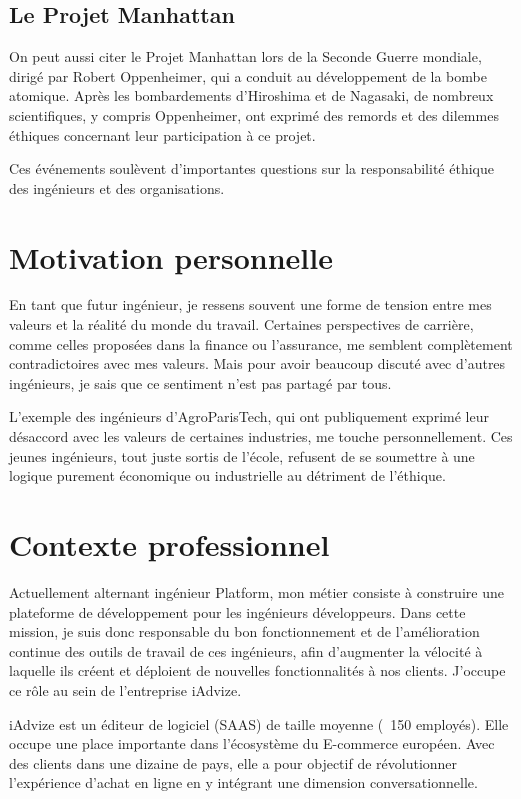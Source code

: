 \documentclass[12pt,a4paper]{report}
\begin{document}
\subsection*{Le Projet Manhattan}

On peut aussi citer le Projet Manhattan lors de la Seconde Guerre mondiale, dirigé par Robert Oppenheimer, qui a conduit au développement de la bombe atomique. Après les bombardements d'Hiroshima et de Nagasaki, de nombreux scientifiques, y compris Oppenheimer, ont exprimé des remords et des dilemmes éthiques concernant leur participation à ce projet.

Ces événements soulèvent d'importantes questions sur la responsabilité éthique des ingénieurs et des organisations.

\section*{Motivation personnelle}

En tant que futur ingénieur, je ressens souvent une forme de tension entre mes valeurs et la réalité du monde du travail.
Certaines perspectives de carrière, comme celles proposées dans la finance ou l’assurance, me semblent complètement contradictoires avec mes valeurs.
Mais pour avoir beaucoup discuté avec d'autres ingénieurs, je sais que ce sentiment n'est pas partagé par tous.

L’exemple des ingénieurs d’AgroParisTech, qui ont publiquement exprimé leur désaccord avec les valeurs de certaines industries, me touche personnellement.
Ces jeunes ingénieurs, tout juste sortis de l'école, refusent de se soumettre à une logique purement économique ou industrielle au détriment de l’éthique.

\section*{Contexte professionnel}

Actuellement alternant ingénieur Platform, mon métier consiste à construire une plateforme de développement pour les ingénieurs développeurs.
Dans cette mission, je suis donc responsable du bon fonctionnement et de l'amélioration continue des outils de travail de ces ingénieurs, afin d'augmenter la vélocité à laquelle ils créent et déploient de nouvelles fonctionnalités à nos clients.
J'occupe ce rôle au sein de l'entreprise iAdvize.

iAdvize est un éditeur de logiciel (\gls{SAAS}) de taille moyenne (~150 employés).
Elle occupe une place importante dans l'écosystème du E-commerce européen. Avec des clients dans une dizaine de pays, elle a pour objectif de révolutionner l'expérience d'achat en ligne en y intégrant une dimension conversationnelle.
\end{document}
